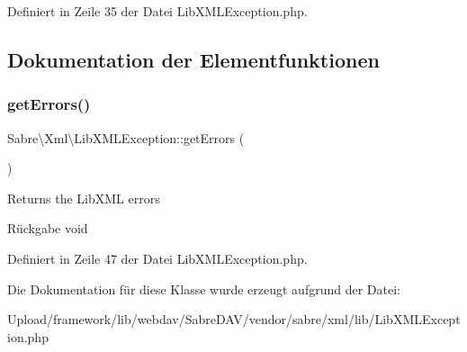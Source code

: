 Definiert in Zeile 35 der Datei Lib\+X\+M\+L\+Exception.\+php.



\subsection{Dokumentation der Elementfunktionen}
\mbox{\label{class_sabre_1_1_xml_1_1_lib_x_m_l_exception_a1e687a71bf8968fc88ab75f919d6d0c9}} 
\subsubsection{\texorpdfstring{get\+Errors()}{getErrors()}}
{\footnotesize\ttfamily Sabre\textbackslash{}\+Xml\textbackslash{}\+Lib\+X\+M\+L\+Exception\+::get\+Errors (\begin{DoxyParamCaption}{ }\end{DoxyParamCaption})}

Returns the Lib\+X\+ML errors

\begin{DoxyReturn}{Rückgabe}
void 
\end{DoxyReturn}


Definiert in Zeile 47 der Datei Lib\+X\+M\+L\+Exception.\+php.



Die Dokumentation für diese Klasse wurde erzeugt aufgrund der Datei\+:\begin{DoxyCompactItemize}
\item 
Upload/framework/lib/webdav/\+Sabre\+D\+A\+V/vendor/sabre/xml/lib/Lib\+X\+M\+L\+Exception.\+php\end{DoxyCompactItemize}
